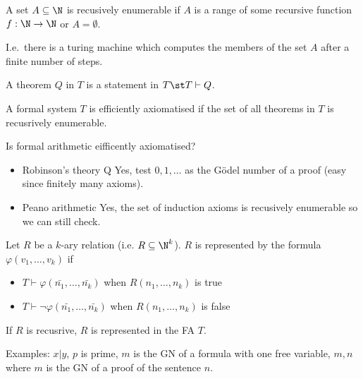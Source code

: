 \documentclass{article}
\begin{document}
\begin{definition}
    A set \(A \subseteq \N\) is recusively enumerable if
    \(A\) is a range of some recursive function \(f:\N\to\N\)
    or \(A = \emptyset\).
    
    I.e.\ there is a turing machine which computes the members of the set \(A\)
    after a finite number of steps.
\end{definition}
\begin{definition}[Theorem]
    A theorem \(Q\) in \(T\) is a statement in \(T \st T \vdash Q\).
\end{definition}
\begin{definition}
    A formal system \(T\) is efficiently axiomatised if
    the set of all theorems in \(T\) is recusrively enumerable.
\end{definition}
Is formal arithmetic eifficently axiomatised?
\begin{itemize}
    \item Robinson's theory Q
        \rightarrow Yes, test \(0, 1, \ldots\) as the Gödel number of a proof
        (easy since finitely many axioms).
    \item Peano arithmetic
        \rightarrow Yes, the set of induction axioms
        is recusively enumerable so we can still check.
\end{itemize} 
\begin{definition}[Representability]
    Let \(R\) be a \(k\)-ary relation (i.e. \(R\subseteq\N^k\)).
    \(R\) is represented by the formula
    \(\varphi(v_1,\ldots,v_k)\) if
    \begin{itemize}
        \item  \(T \vdash \varphi(\bar{n_1},\ldots,\bar{n_k})\) when \(R(n_1,\ldots,n_k)\) is true
        \item  \(T \vdash \lnot\varphi(\bar{n_1},\ldots,\bar{n_k})\) when \(R(n_1,\ldots,n_k)\) is false
    \end{itemize}
\end{definition}
\begin{theorem}
    If \(R\) is recusrive, \(R\) is represented in the FA \(T\).
    
    Examples: \(x|y\), \(p\) is prime,
    \(m\) is the GN of a formula with one free variable,
    \(m,n\) where \(m\) is the GN of a proof of the sentence \(n\).
\end{theorem}
\end{document}
